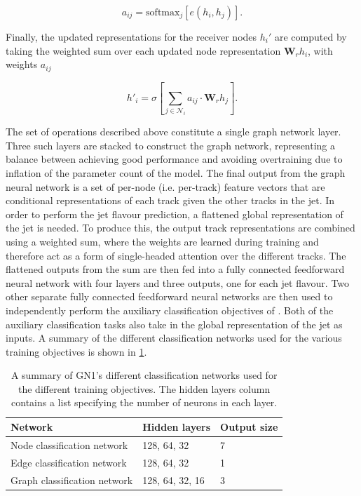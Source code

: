 \begin{equation}\label{eq:attention weights}
    a_{ij} = \mathrm{softmax}_j \left[ e(h_i, h_j) \right].
\end{equation}

Finally, the updated representations for the receiver nodes $h_i'$ are computed by taking the weighted sum over each updated node representation $\mathbf{W}_r h_i$, with weights $a_{ij}$

\begin{equation}\label{eq:updated_node_rep}
    h'_i = \sigma \left[ \sum_{j \in \mathcal{N}_i}{a_{ij} \cdot \mathbf{W}_r {h}_j}  \right].
\end{equation}

The set of operations described above constitute a single graph network layer. 
Three such layers are stacked to construct the graph network, representing a balance between achieving good performance and avoiding overtraining due to inflation of the parameter count of the model.
The final output from the graph neural network is a set of per-node (i.e. per-track) feature vectors that are conditional representations of each track given the other tracks in the jet.
In order to perform the jet flavour prediction, a flattened global representation of the jet is needed.
To produce this, the output track representations are combined using a weighted sum, where the weights are learned during training and therefore act as a form of single-headed attention over the different tracks.
The flattened outputs from the sum are then fed into a fully connected feedforward neural network with four layers and three outputs, one for each jet flavour.
Two other separate fully connected feedforward neural networks are then used to independently perform the auxiliary classification objectives of \GNN.
Both of the auxiliary classification tasks also take in the global representation of the jet as inputs.
A summary of the different classification networks used for the various training objectives is shown in \cref{tab:architecture}.

\begin{table}[!htbp]
  \footnotesize\centering
  \setlength{\tabcolsep}{0.5em} %
  \caption{
      A summary of GN1's different classification networks used for the different training objectives.
      The hidden layers column contains a list specifying the number of neurons in each layer.
      }
  \begin{tabular}{lll}
      \toprule\hline 
      \textbf{Network} & \textbf{Hidden layers} & \textbf{Output size} \\
      \hline
      Node classification network    & 128, 64, 32 & 7 \\
      Edge classification network    & 128, 64, 32 & 1 \\
      Graph classification network   & 128, 64, 32, 16 & 3 \\
      \hline\bottomrule
  \end{tabular}
  \vspace{4mm}
  \label{tab:architecture}
\end{table}

